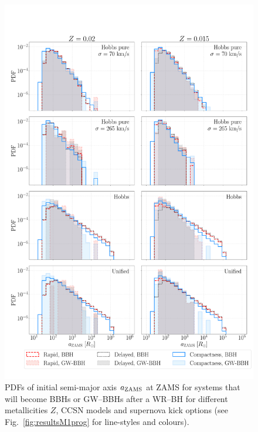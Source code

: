 \documentclass[a4paper,titlepage]{book}     	%
\begin{document}
\begin{figure}
	\centering
	\includegraphics[width=\textwidth]{./images/proga.pdf}	
	\caption{PDFs of initial semi-major axis $a_{\rm ZAMS}$ at ZAMS for systems that will become BBHs or GW--BBHs after a WR--BH for different metallicities $Z$, CCSN models and supernova kick options (see Fig.\ \ref{fig:resultsM1prog} for line-styles and colours).}\label{fig:resultsaprog}
\end{figure}
\end{document}
